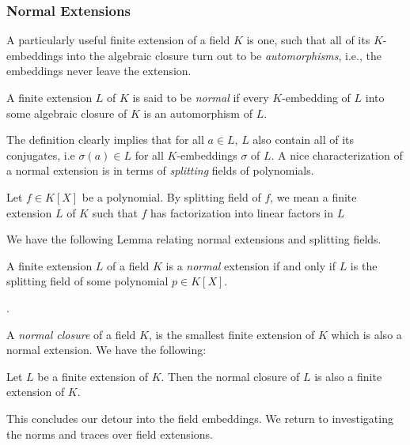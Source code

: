 \documentclass[11pt]{article}
\begin{document}
\subsubsection{Normal Extensions}\label{subsubsec:normal-extensions}
A particularly useful finite extension of a field $K$ is one, such that all of its $K$-embeddings into the algebraic closure turn out
to be {\em automorphisms}, i.e., the embeddings never leave the extension.
\begin{definition}\label{defn:normal-extension}
A finite extension $L$ of $K$ is said to be {\em normal} if every $K$-embedding of $L$ into some algebraic closure of $K$ is an automorphism
of $L$.
\end{definition}
The definition clearly implies that for all $a\in L$, $L$ also contain all of its conjugates, i.e $\sigma(a)\in L$ for all $K$-embeddings $\sigma$
of $L$. A nice characterization of a normal extension is in terms of {\em splitting} fields of polynomials.

\begin{definition}\label{defn:splitting-field}
Let $f\in K[X]$ be a polynomial. By splitting field of $f$, we mean a finite extension $L$ of $K$ such that $f$ has factorization into linear factors
in $L$
\end{definition}

We have the following Lemma relating normal extensions and splitting fields.
\begin{lemma}\label{lem:normal-extn-splitting-fields}
A finite extension $L$ of a field $K$ is a {\em normal} extension if and only if $L$ is the splitting field of some polynomial $p\in K[X]$.
\end{lemma}.

A {\em normal closure} of a field $K$, is the smallest finite extension of $K$ which is also a normal extension. We have the following:
\begin{lemma}\label{lem:normal-closure}
Let $L$ be a finite extension of $K$. Then the normal closure of $L$ is also a finite extension of $K$.
\end{lemma}

This concludes our detour into the field embeddings. We return to investigating the norms and traces over field extensions.
\end{document}
